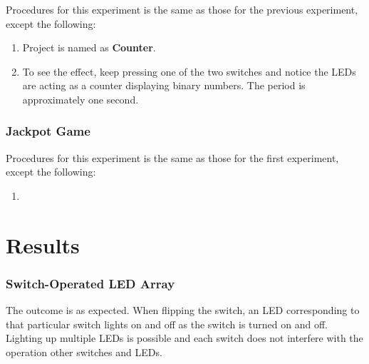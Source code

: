 \documentclass[11pt,letterpaper,titlepage]{article}
\begin{document}
Procedures for this experiment is the same as those for the previous experiment, except the following:

\begin{enumerate}
    \item Project is named as \textbf{Counter}.
    
    
    
    
    
    \item To see the effect, keep pressing one of the two switches and notice the LEDs are acting as a counter displaying binary numbers. The period is approximately one second.
    
    
\end{enumerate}

\section{Jackpot Game}

Procedures for this experiment is the same as those for the first experiment, except the following:

\begin{enumerate}
    \item 
\end{enumerate}

\newpage

\part{Results}

\section{Switch-Operated LED Array}

The outcome is as expected. When flipping the switch, an LED corresponding to that particular switch lights on and off as the switch is turned on and off. Lighting up multiple LEDs is possible and each switch does not interfere with the operation other switches and LEDs.
\end{document}
